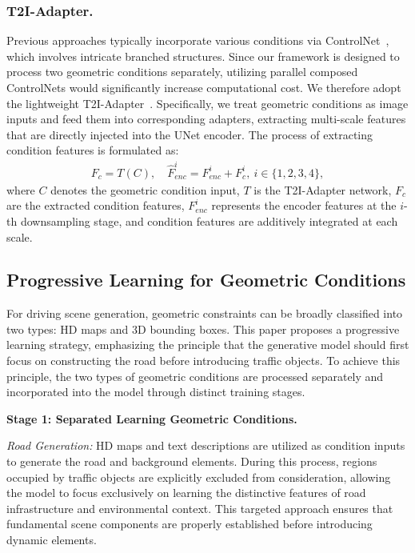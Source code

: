 \subsubsection{T2I-Adapter.} 
Previous approaches typically incorporate various conditions via ControlNet~\cite{zhang2023adding}, which involves intricate branched structures. Since our framework is designed to process two geometric conditions separately, utilizing parallel composed ControlNets would significantly increase computational cost.
We therefore adopt the lightweight T2I-Adapter~\cite{mou2024t2i}. Specifically, we treat geometric conditions as image inputs and feed them into corresponding adapters, extracting multi-scale features that are directly injected into the UNet encoder. The process of extracting condition features is formulated as:
\begin{align}
	F_c = T(C), \quad \hat{F}_{enc}^{i} = F_{enc}^{i} + F_{c}^{i},\ i\in \{1,2,3,4\},
\end{align}
where $C$ denotes the geometric condition input, $T$ is the T2I-Adapter network, $F_c$ are the extracted condition features, $F_{enc}^{i}$ represents the encoder features at the $i$-th downsampling stage, and condition features are additively integrated at each scale.







\subsection{Progressive Learning for Geometric Conditions}
For driving scene generation, geometric constraints can be broadly classified into two types: HD maps and 3D bounding boxes. 
This paper proposes a progressive learning strategy, emphasizing the principle that the generative model should first focus on constructing the road before introducing traffic objects. 
To achieve this principle, the two types of geometric conditions are processed separately and incorporated into the model through distinct training stages. 

\textbf{Stage 1: Separated Learning Geometric Conditions.} 

\textit{{Road Generation:}}
HD maps and text descriptions are utilized as condition inputs to generate the road and background elements. 
During this process, regions occupied by traffic objects are explicitly excluded from consideration, allowing the model to focus exclusively on learning the distinctive features of road infrastructure and environmental context. 
This targeted approach ensures that fundamental scene components are properly established before introducing dynamic elements.

